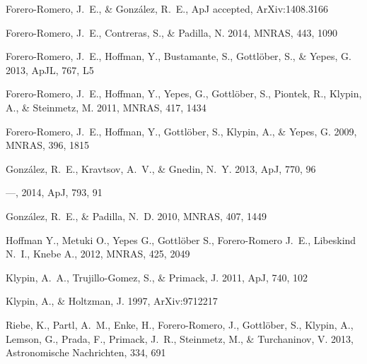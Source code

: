 \documentclass{iau}
\newcommand{\apj}{ApJ}
\newcommand{\apjl}{ApJL}
\newcommand{\mnras}{MNRAS}
\begin{document}
\begin{thebibliography}{}


{{Forero-Romero}, J.~E., \& {Gonz{\'a}lez}, R.~E.}, ApJ accepted,
ArXiv:1408.3166 

{Forero-Romero}, J.~E., {Contreras}, S., \& {Padilla}, N. 2014, \mnras, 443,
1090

{Forero-Romero}, J.~E., {Hoffman}, Y., {Bustamante}, S., {Gottl{\"o}ber}, S.,
\& {Yepes}, G. 2013, \apjl, 767, L5


{Forero-Romero}, J.~E., {Hoffman}, Y., {Yepes}, G., {Gottl{\"o}ber}, S.,
{Piontek}, R., {Klypin}, A., \& {Steinmetz}, M. 2011, \mnras, 417, 1434


{Forero-Romero}, J.~E., {Hoffman}, Y., {Gottl{\"o}ber}, S., {Klypin}, A., \&
{Yepes}, G. 2009, \mnras, 396, 1815


{Gonz{\'a}lez}, R.~E., {Kravtsov}, A.~V., \& {Gnedin}, N.~Y. 2013, \apj, 770,
96

---, 2014, \apj, 793, 91


{Gonz{\'a}lez}, R.~E., \& {Padilla}, N.~D. 2010, \mnras, 407, 1449


 {Hoffman} Y., {Metuki} O., {Yepes}
  G., {Gottl{\"o}ber} S., {Forero-Romero} J.~E., {Libeskind} N.~I.,
  {Knebe} A., 2012, \mnras, 425, 2049 

{Klypin}, A.~A., {Trujillo-Gomez}, S., \& {Primack}, J. 2011, \apj,
740, 102

{Klypin}, A., \& {Holtzman}, J. 1997, ArXiv:9712217

{Riebe}, K., {Partl}, A.~M., {Enke}, H., {Forero-Romero}, J., {Gottl{\"o}ber},
  S., {Klypin}, A., {Lemson}, G., {Prada}, F., {Primack}, J.~R., {Steinmetz},
  M., \& {Turchaninov}, V. 2013, Astronomische Nachrichten, 334, 691



\end{thebibliography}
\end{document}
